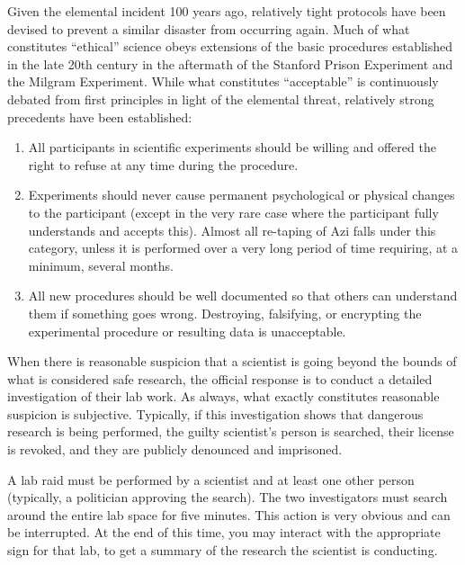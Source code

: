 \documentclass[green]{elementals}
\begin{document}
\name{\gEthics{}}

Given the elemental incident 100 years ago, relatively tight protocols have been devised to prevent a similar disaster from occurring again. Much of what constitutes ``ethical'' science obeys extensions of the basic procedures established in the late 20th century in the aftermath of the Stanford Prison Experiment and the Milgram Experiment. While what constitutes ``acceptable'' is continuously debated from first principles in light of the elemental threat, relatively strong precedents have been established:

\begin{enumerate}
\item All participants in scientific experiments should be willing and offered the right to refuse at any time during the procedure.
\item Experiments should never cause permanent psychological or physical changes to the participant (except in the very rare case where the participant fully understands and accepts this). Almost all re-taping of Azi falls under this category, unless it is performed over a very long period of time requiring, at a minimum, several months.
\item All new procedures should be well documented so that others can understand them if something goes wrong. Destroying, falsifying, or encrypting the experimental procedure or resulting data is unacceptable.
\end{enumerate}

When there is reasonable suspicion that a scientist is going beyond the bounds of what is considered safe research, the official response is to conduct a detailed investigation of their lab work. As always, what exactly constitutes reasonable suspicion is subjective. Typically, if this investigation shows that dangerous research is being performed, the guilty scientist's person is searched, their license is revoked, and they are publicly denounced and imprisoned.

A lab raid must be performed by a scientist and at least one other person (typically, a politician approving the search). The two investigators must search around the entire lab space for five minutes. This action is very obvious and can be interrupted. At the end of this time, you may interact with the appropriate sign for that lab, to get a summary of the research the scientist is conducting.
\end{document}
